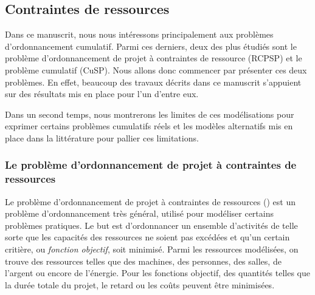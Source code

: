 
\subsection{Contraintes de ressources}
\label{sec:ordo_res}
Dans ce manuscrit, nous nous intéressons  principalement  aux problèmes
d'ordonnancement cumulatif. Parmi ces derniers, deux des plus
étudiés sont le problème d'ordonnancement de projet à contraintes de
ressource (RCPSP) et le problème cumulatif (CuSP). Nous allons donc
commencer par présenter ces deux problèmes. En effet, beaucoup des
travaux décrits dans ce manuscrit s'appuient sur des résultats mis en
place pour l'un d'entre eux. 

Dans un second temps, nous montrerons les limites de ces modélisations
pour exprimer certains problèmes cumulatifs réels et
les modèles alternatifs mis en place dans la littérature pour pallier ces
limitations.

\subsubsection{Le problème d'ordonnancement de projet à contraintes de
ressources}

Le problème d'ordonnancement de projet à contraintes de ressources
(\RCPSP) est un problème d'ordonnancement très général, utilisé pour
modéliser certains problèmes pratiques. Le but est
d'ordonnancer un ensemble d'activités de telle sorte que les capacités
des ressources ne soient pas excédées et qu'un certain critière, ou
{\it  fonction objectif}, soit minimisé. Parmi les ressources
modélisées, on trouve des ressources telles que des machines, des
personnes, des salles, de l'argent ou encore de l'énergie. Pour les
fonctions objectif, des quantités telles que la durée totale du
projet, le retard ou les coûts peuvent être minimisées.

